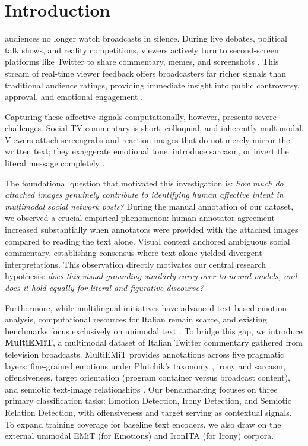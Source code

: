\section{Introduction}
 audiences no longer watch broadcasts in silence. During live debates, political talk shows, and reality competitions, viewers actively turn to second-screen platforms like Twitter to share commentary, memes, and screenshots \cite{SocialTV}. This stream of real-time viewer feedback offers broadcasters far richer signals than traditional audience ratings, providing immediate insight into public controversy, approval, and emotional engagement \cite{memorai}. 

Capturing these affective signals computationally, however, presents severe challenges. Social TV commentary is short, colloquial, and inherently multimodal. Viewers attach screengrabs and reaction images that do not merely mirror the written text; they exaggerate emotional tone, introduce sarcasm, or invert the literal message completely \cite{schifanella2016multimodal, cai2019multimodal}. 

The foundational question that motivated this investigation is: \textit{how much do attached images genuinely contribute to identifying human affective intent in multimodal social network posts?} \cite{poria2017review} During the manual annotation of our dataset, we observed a crucial empirical phenomenon: human annotator agreement increased substantially when annotators were provided with the attached images compared to reading the text alone. Visual context anchored ambiguous social commentary, establishing consensus where text alone yielded divergent interpretations. This observation directly motivates our central research hypothesis: \textit{does this visual grounding similarly carry over to neural models, and does it hold equally for literal and figurative discourse?}

Furthermore, while multilingual initiatives have advanced text-based emotion analysis, computational resources for Italian remain scarce, and existing benchmarks focus exclusively on unimodal text \cite{bianchi2021feel, emit, MultiEmotion}. To bridge this gap, we introduce \textbf{MultiEMiT}, a multimodal dataset of Italian Twitter commentary gathered from television broadcasts. MultiEMiT provides annotations across five pragmatic layers: fine-grained emotions under Plutchik's taxonomy \cite{Plutchik}, irony and sarcasm, offensiveness, target orientation (program container versus broadcast content), and semiotic text-image relationships \cite{MultiM}. Our benchmarking focuses on three primary classification tasks: Emotion Detection, Irony Detection, and Semiotic Relation Detection, with offensiveness and target serving as contextual signals. To expand training coverage for baseline text encoders, we also draw on the external unimodal EMiT (for Emotions) \cite{emit} and IronITA (for Irony) \cite{ironita2018} corpora.

